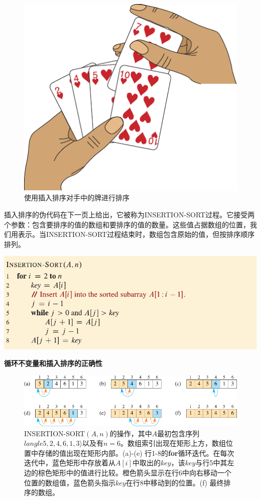 \documentclass[lang=cn,newtx,10pt,scheme=chinese]{elegantbook}
\begin{document}
\begin{figure}[htbp]
    \centering
    \includegraphics{算法导论第四版插图/第二章/插入排序打牌示意图.pdf}
    \caption{使用插入排序对手中的牌进行排序}
    \label{fig:使用插入排序对手中的牌进行排序}
\end{figure}

插入排序的伪代码在下一页上给出，它被称为INSERTION-SORT过程。它接受两个参数：包含要排序的值的数组和要排序的值的数量。这些值占据数组的位置，我们用表示。当INSERTION-SORT过程结束时，数组包含原始的值，但按排序顺序排列。

\includegraphics{算法导论第四版插图/第二章/插入排序伪代码.pdf}

\textbf{循环不变量和插入排序的正确性}

\begin{figure}[htbp]
    \centering
    \includegraphics{算法导论第四版插图/第二章/插入排序过程示意图.pdf}
    \caption{INSERTION-SORT$(A,n)$的操作，其中$A$最初包含序列$langle 5,2,4,6,1,3 \rangle$以及有$n = 6$。数组索引出现在矩形上方，数组位置中存储的值出现在矩形内部。(a)-(e) 行1-8的\textbf{for}循环迭代。在每次迭代中，蓝色矩形中存放着从$A[i]$中取出的$key$，该$key$与行5中其左边的棕色矩形中的值进行比较。橙色箭头显示在行6中向右移动一个位置的数组值，蓝色箭头指示$key$在行8中移动到的位置。(f) 最终排序的数组。}
    \label{fig:插入排序过程示意图}
\end{figure}
\end{document}
